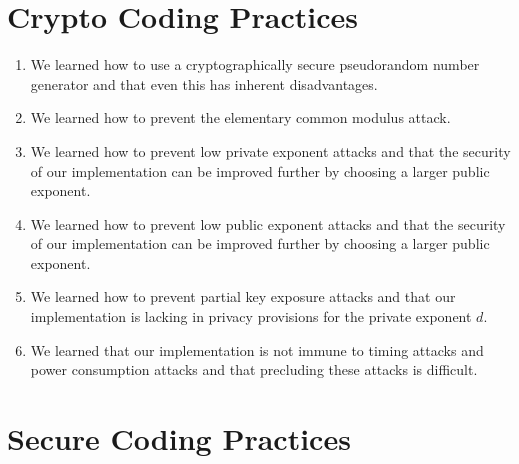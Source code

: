 \documentclass[letterpaper]{article}
\begin{document}
\section{Crypto Coding Practices}

\begin{enumerate}
    \item We learned how to use a cryptographically secure pseudorandom number generator and that even this has inherent disadvantages.

    \item We learned how to prevent the elementary common modulus attack.

    \item We learned how to prevent low private exponent attacks and that the security of our implementation can be improved further by choosing a larger public exponent.

    \item We learned how to prevent low public exponent attacks and that the security of our implementation can be improved further by choosing a larger public exponent.

    \item We learned how to prevent partial key exposure attacks and that our implementation is lacking in privacy provisions for the private exponent $d$.

    \item We learned that our implementation is not immune to timing attacks and power consumption attacks and that precluding these attacks is difficult.
\end{enumerate}

\section{Secure Coding Practices}
\end{document}
